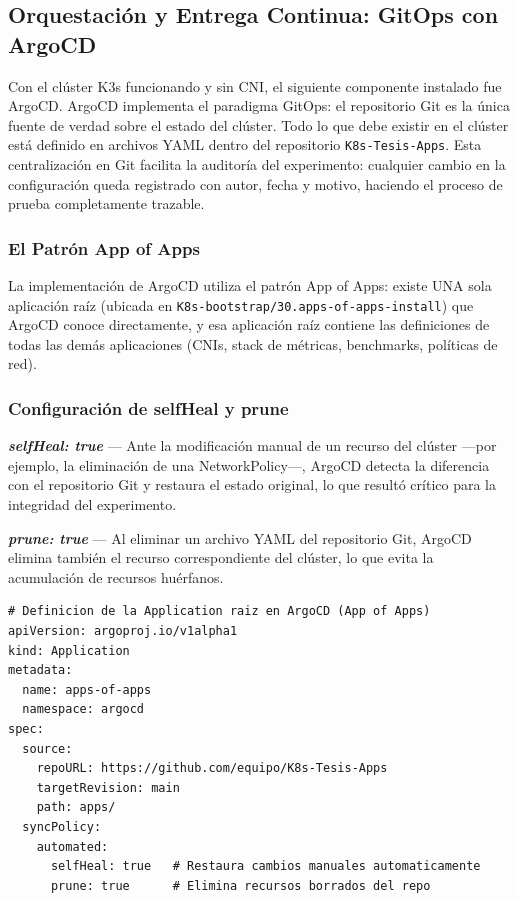 \subsection{Orquestación y Entrega Continua: GitOps con ArgoCD}

Con el clúster K3s funcionando y sin CNI, el siguiente componente instalado fue ArgoCD. ArgoCD implementa el paradigma GitOps: el repositorio Git es la única fuente de verdad sobre el estado del clúster. Todo lo que debe existir en el clúster está definido en archivos YAML dentro del repositorio \texttt{K8s-Tesis-Apps}. Esta centralización en Git facilita la auditoría del experimento: cualquier cambio en la configuración queda registrado con autor, fecha y motivo, haciendo el proceso de prueba completamente trazable.

\subsubsection{El Patrón App of Apps}

La implementación de ArgoCD utiliza el patrón App of Apps: existe UNA sola aplicación raíz (ubicada en \texttt{K8s-bootstrap/30.apps-of-apps-install}) que ArgoCD conoce directamente, y esa aplicación raíz contiene las definiciones de todas las demás aplicaciones (CNIs, stack de métricas, benchmarks, políticas de red).

\subsubsection{Configuración de selfHeal y prune}

\textbf{\emph{selfHeal: true}} --- Ante la modificación manual de un recurso del clúster ---por ejemplo, la eliminación de una NetworkPolicy---, ArgoCD detecta la diferencia con el repositorio Git y restaura el estado original, lo que resultó crítico para la integridad del experimento.

\textbf{\emph{prune: true}} --- Al eliminar un archivo YAML del repositorio Git, ArgoCD elimina también el recurso correspondiente del clúster, lo que evita la acumulación de recursos huérfanos.

\begin{lstlisting}
# Definicion de la Application raiz en ArgoCD (App of Apps)
apiVersion: argoproj.io/v1alpha1
kind: Application
metadata:
  name: apps-of-apps
  namespace: argocd
spec:
  source:
    repoURL: https://github.com/equipo/K8s-Tesis-Apps
    targetRevision: main
    path: apps/
  syncPolicy:
    automated:
      selfHeal: true   # Restaura cambios manuales automaticamente
      prune: true      # Elimina recursos borrados del repo
\end{lstlisting}


